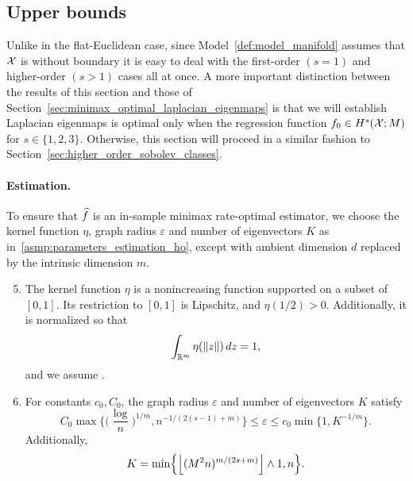 \subsection{Upper bounds}
Unlike in the flat-Euclidean case, since Model~\ref{def:model_manifold} assumes that $\mathcal{X}$ is without boundary it is easy to deal with the first-order $(s = 1)$ and higher-order $(s > 1)$ cases all at once. A more important distinction between the results of this section and those of Section~\ref{sec:minimax_optimal_laplacian_eigenmaps} is that we will establish Laplacian eigenmaps is optimal only when the regression function $f_0 \in H^s(\mathcal{X};M)$ for $s \in \{1,2,3\}$. Otherwise, this section will proceed in a similar fashion to Section~\ref{sec:higher_order_sobolev_classes}.

\paragraph{Estimation.}
To ensure that $\widehat{f}$ is an in-sample minimax rate-optimal estimator, we choose the kernel function $\eta$, graph radius $\varepsilon$ and number of eigenvectors $K$ as in~\ref{asmp:parameters_estimation_ho}, except with ambient dimension $d$ replaced by the intrinsic dimension $m$.

\begin{enumerate}[label=(P\arabic*)]
	\setcounter{enumi}{4}
	\item 
	\label{asmp:kernel_manifold}
	The kernel function $\eta$ is a nonincreasing function supported on a subset of $[0,1]$. Its restriction to $[0,1]$ is Lipschitz, and $\eta(1/2) > 0$. Additionally, it is normalized so that
	\begin{equation*}
	\int_{\mathbb{R}^m} \eta(\|z\|) \,dz = 1,
	\end{equation*}
	and we assume .
	\item 
	\label{asmp:parameters_estimation_manifold}
	For constants $c_0,C_0$, the graph radius $\varepsilon$ and number of eigenvectors $K$ satisfy
	\begin{equation}
	\label{eqn:radius_estimation_manifold}
	C_0\max\biggl\{\biggl(\frac{\log}{n}\biggr)^{1/m}, n^{-1/(2(s - 1) + m)}\biggr\} \leq \varepsilon \leq c_0\min\{1, K^{-1/m}\}.
	\end{equation}
	Additionally,
	\begin{equation*}
	K = \min\Bigl\{\left\lfloor (M^2n)^{m/(2s + m)} \right\rfloor \wedge 1,n \Bigr\}.
	\end{equation*}
\end{enumerate}

